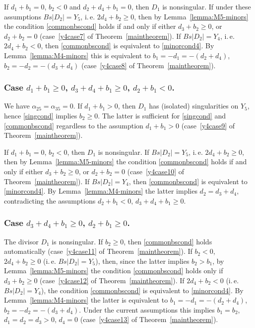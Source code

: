 \documentclass[12pt]{amsart}
\theoremstyle{definition}
\theoremstyle{remark}
\begin{document}
If $d_1+b_1=0$, $b_2<0$ and $d_2+d_4+b_1=0$, then $D_1$ is nonsingular. 
If under these assumptions $Bs|D_2|=Y_5$, i.\,e. $2d_4+b_2\geqslant 0$, then
by Lemma~\ref{lemma:M5-minors} 
the condition \ref{commonbscond} holds if and only if 
either $d_3+b_2\geqslant 0$, or $d_2+b_2=0$
(case~\ref{y4case7} of Theorem~\ref{maintheorem}). 
If $Bs|D_2|=Y_4$,
i.\,e. $2d_4+b_2<0$, then \ref{commonbscond} is equivalent to \ref{minorcond4}.
By Lemma~\ref{lemma:M4-minors} 
this is equivalent to $b_1=-d_1=-(d_2+d_4)$, $b_2=-d_2=-(d_3+d_4)$
(case~\ref{y4case8} of Theorem~\ref{maintheorem}).

\subsubsection{Case $d_1+b_1\geqslant 0$, $d_3+d_4+b_1\geqslant 0$, 
$d_2+b_1<0$.} 
We have $\alpha_{25}=\alpha_{35}=0$. If $d_1+b_1>0$, then $D_1$ has 
(isolated) singularities on $Y_5$, hence \ref{singcond} implies
$b_2\geqslant 0$. The latter is sufficient for  
\ref{singcond} and \ref{commonbscond} regardless to the assumption $d_1+b_1>0$
(case~\ref{y4case9} of Theorem~\ref{maintheorem}).

If $d_1+b_1=0$, $b_2<0$, then $D_1$ is nonsingular. If $Bs|D_2|=Y_5$, i.\,e.
$2d_4+b_2\geqslant 0$, then by Lemma~\ref{lemma:M5-minors} 
the condition \ref{commonbscond} holds if and only if either 
$d_3+b_2\geqslant 0$, or $d_2+b_2=0$
(case~\ref{y4case10} of Theorem~\ref{maintheorem}). 
If $Bs|D_2|=Y_4$, then \ref{commonbscond} is equivalent to \ref{minorcond4}.
By Lemma~\ref{lemma:M4-minors} the latter implies $d_2=d_3+d_4$,
contradicting the assumptions $d_2+b_1<0$, $d_3+d_4+b_1\geqslant 0$. 

\subsubsection{Case $d_3+d_4+b_1\geqslant 0$, $d_2+b_1\geqslant 0$.} 
The divisor $D_1$ is nonsingular. If $b_2\geqslant 0$, then \ref{commonbscond} 
holds automatically
(case~\ref{y4case11} of Theorem~\ref{maintheorem}). If $b_2<0$, 
$2d_4+b_2\geqslant 0$ (i.\,e. $Bs|D_2|=Y_5$), then, since the latter implies 
$b_2>b_1$, by Lemma~\ref{lemma:M5-minors} the condition \ref{commonbscond} 
holds only if $d_3+b_2\geqslant 0$
(case~\ref{y4case12} of Theorem~\ref{maintheorem}). 
If $2d_4+b_2<0$ (i.\,e. $Bs|D_2|=Y_4$), 
the condition \ref{commonbscond} is equivalent to \ref{minorcond4}. 
By Lemma~\ref{lemma:M4-minors} the latter is equivalent to 
$b_1=-d_1=-(d_2+d_4)$, $b_2=-d_2=-(d_3+d_4)$. 
Under the current assumptions this implies $b_1=b_2$, $d_1=d_2=d_3>0$, 
$d_4=0$ (case~\ref{y4case13} of Theorem~\ref{maintheorem}).
\end{document}
